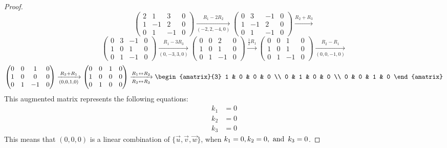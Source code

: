 \begin{enumerate}
\begin{proof}
\[      \begin{pmatrix}
        2 & 1  & 3  & 0 \\
        1 & -1 & 2  & 0 \\
        0 & 1  & -1 & 0
      \end{pmatrix} \xrightarrow[(-2,2,-4,0)]{R_1 - 2R_2}
      \begin{pmatrix}
        0 & 3  & -1 & 0 \\
        1 & -1 & 2  & 0 \\
        0 & 1  & -1 & 0
      \end{pmatrix} \xrightarrow{R_2 + R_3}
    \]
    \[
      \begin{pmatrix}
        0 & 3 & -1 & 0 \\
        1 & 0 & 1  & 0 \\
        0 & 1 & -1 & 0
      \end{pmatrix} \xrightarrow[(0,-3,3,0)]{R_1 - 3R_3}
      \begin{pmatrix}
        0 & 0 & 2  & 0 \\
        1 & 0 & 1  & 0 \\
        0 & 1 & -1 & 0
      \end{pmatrix} \xrightarrow{\frac{1}{2}R_1}
      \begin{pmatrix}
        0 & 0 & 1  & 0 \\
        1 & 0 & 1  & 0 \\
        0 & 1 & -1 & 0
      \end{pmatrix} \xrightarrow[(0,0,-1,0)]{R_2 - R_1}
    \]
    \[
      \begin{pmatrix}
        0 & 0 & 1  & 0 \\
        1 & 0 & 0  & 0 \\
        0 & 1 & -1 & 0
      \end{pmatrix} \xrightarrow[(0,0,1,0)]{R_3 + R_1}
      \begin{pmatrix}
        0 & 0 & 1 & 0 \\
        1 & 0 & 0 & 0 \\
        0 & 1 & 0 & 0
      \end{pmatrix} \xrightarrow[R_2 \leftrightarrow R_3]{R_1 \leftrightarrow R_2}
      \begin{amatrix}{3}
        1 & 0 & 0 & 0 \\
        0 & 1 & 0 & 0 \\
        0 & 0 & 1 & 0
      \end{amatrix}
    \]
    This augmented matrix represents the following equations:
    \begin{align*}
      k_1 & = 0 \\
      k_2 & = 0 \\
      k_3 & = 0
    \end{align*}
    This means that $(0,0,0)$ is a linear combination of $\{\vec{u},\vec{v},\vec{w}\}$, when $k_1 = 0, k_2 = 0, \operatorname{~\text{and}~} k_3 = 0$.
  \end{proof}
\end{enumerate}

